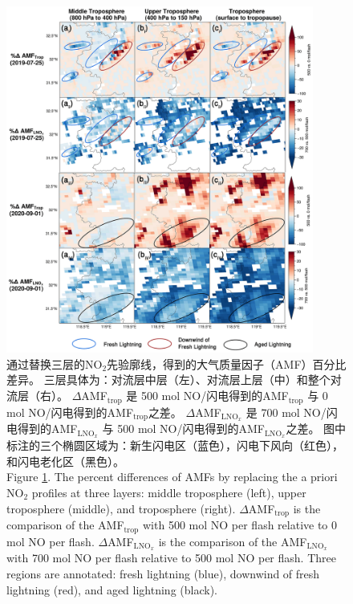 \begin{figure}[H]
    \centering
    \includegraphics[width=0.9\textwidth]{./figures/china_s5p_amf_diff.png}
    \caption{
    通过替换三层的NO$_2$先验廓线，得到的大气质量因子（AMF）百分比差异。
    三层具体为：对流层中层（左）、对流层上层（中）和整个对流层（右）。
     $\Delta$AMF$_\textrm{trop}$ 是 500 mol NO/闪电得到的AMF$_\textrm{trop}$ 与 0 mol NO/闪电得到的AMF$_\textrm{trop}$之差。
     $\Delta$AMF$_\textrm{LNO$_x$}$ 是 700 mol NO/闪电得到的AMF$_\textrm{LNO$_x$}$ 与 500 mol NO/闪电得到的AMF$_\textrm{LNO$_x$}$之差。
     图中标注的三个椭圆区域为：新生闪电区（蓝色），闪电下风向（红色），和闪电老化区（黑色）。\\
    Figure \ref{fig:china_s5p_amf_diff}. The percent differences of AMFs by replacing the a priori NO$_2$ profiles at three layers:
    middle troposphere (left), upper troposphere (middle), and troposphere (right).
    $\Delta$AMF$_\textrm{trop}$ is the comparison of the AMF$_\textrm{trop}$ with 500 mol NO per flash relative to 0 mol NO per flash.
    $\Delta$AMF$_\textrm{LNO$_x$}$ is the comparison of the AMF$_\textrm{LNO$_x$}$ with 700 mol NO per flash relative to 500 mol NO per flash.
    Three regions are annotated: fresh lightning (blue),
    downwind of fresh lightning (red),
    and aged lightning (black).
    }
    \label{fig:china_s5p_amf_diff}
\end{figure}


